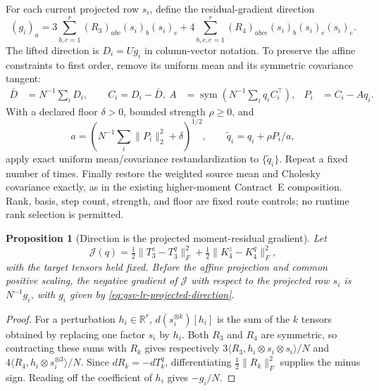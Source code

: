 \documentclass[11pt]{article}
\newtheorem{proposition}{Proposition}[section]
\theoremstyle{definition}
\theoremstyle{remark}
\begin{document}
For each current projected row $s_i$, define the residual-gradient direction
\begin{equation}
 (g_i)_a=
 3\sum_{b,c=1}^r(R_3)_{abc}(s_i)_b(s_i)_c
 +4\sum_{b,c,e=1}^r(R_4)_{abce}(s_i)_b(s_i)_c(s_i)_e.
 \label{eq:gsv-lr-projected-direction}
\end{equation}
The lifted direction is $D_i=Ug_i$ in column-vector notation.  To preserve
the affine constraints to first order, remove its uniform mean and its
symmetric covariance tangent:
\begin{align}
 \bar D&=N^{-1}\sum_iD_i,\qquad C_i=D_i-\bar D,\
 A&=\operatorname{sym}\!\left(N^{-1}\sum_i q_iC_i^\top\right),
 &P_i&=C_i-Aq_i .
 \label{eq:gsv-lr-affine-projection}
\end{align}
With a declared floor $\delta>0$, bounded strength $\rho\ge0$, and
\begin{equation}
 a=\left(N^{-1}\sum_i\lVert P_i\rVert_2^2+\delta\right)^{1/2},
 \qquad \widetilde q_i=q_i+\rho P_i/a,
 \label{eq:gsv-lr-bounded-update}
\end{equation}
apply exact uniform mean/covariance restandardization to
$\{\widetilde q_i\}$.  Repeat a fixed number of times.  Finally restore the
weighted source mean and Cholesky covariance exactly, as in the existing
higher-moment Contract~E composition.  Rank, basis, step count, strength, and
floor are fixed route controls; no runtime rank selection is permitted.

\begin{proposition}[Direction is the projected moment-residual gradient]
\label{prop:gsv-lr-gradient}
Let
\begin{equation}
 \mathcal J(q)=\tfrac12\lVert T_3^z-T_3^q\rVert_F^2
 +\tfrac12\lVert K_4^z-K_4^q\rVert_F^2,
 \label{eq:gsv-lr-objective}
\end{equation}
with the target tensors held fixed.  Before the affine projection and common
positive scaling, the negative gradient of $\mathcal J$ with respect to the
projected row $s_i$ is $N^{-1}g_i$, with $g_i$ given by
\eqref{eq:gsv-lr-projected-direction}.
\end{proposition}

\begin{proof}
For a perturbation $h_i\in\mathbb R^r$,
$d(s_i^{\otimes k})[h_i]$ is the sum of the $k$ tensors obtained by replacing
one factor $s_i$ by $h_i$.  Both $R_3$ and $R_4$ are symmetric, so contracting
these sums with $R_k$ gives respectively
$3\langle R_3,h_i\otimes s_i\otimes s_i\rangle/N$ and
$4\langle R_4,h_i\otimes s_i^{\otimes3}\rangle/N$.
Since $dR_k=-dT_k^q$, differentiating
$\tfrac12\lVert R_k\rVert_F^2$ supplies the minus sign.  Reading off the
coefficient of $h_i$ gives $-g_i/N$.
\end{proof}
\end{document}
